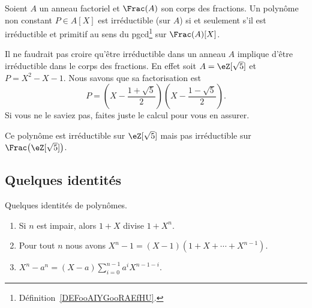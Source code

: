 \begin{corollary}       \label{CORooZCSOooHQVAOV}
    Soient \( A\) un anneau factoriel et \( \Frac(A)\) son corps des fractions. Un polynôme non constant \( P\in A[X]\) est irréductible (sur \( A\)) si et seulement s'il est irréductible et primitif au sens du pgcd\footnote{Définition~\ref{DEFooAIYGooRAEfHU}.} sur \( \Frac(A)[X]\).
\end{corollary}

\begin{example}
    Il ne faudrait pas croire qu'être irréductible dans un anneau \( A\) implique d'être irréductible dans le corps des fractions. En effet soit \( A=\eZ[\sqrt{ 5 }]\) et \( P=X^2-X-1\). Nous savons que sa factorisation est 
    \begin{equation}
        P=\left( X-\frac{ 1+\sqrt{ 5 } }{ 2 } \right)\left( X-\frac{ 1-\sqrt{ 5 } }{ 2 } \right).
    \end{equation}
    Si vous ne le saviez pas, faites juste le calcul pour vous en assurer.

    Ce polynôme est irréductible sur \( \eZ[\sqrt{ 5 }]\) mais pas irréductible sur \( \Frac\big( \eZ[\sqrt{ 5 }] \big)\).
\end{example}

\subsection{Quelques identités}

\begin{lemma}   \label{LemISPooHIKJBU}
    Quelques identités de polynômes.
    \begin{enumerate}
        \item   \label{ItemLTBooAcyMtN}
            Si \( n\) est impair, alors \( 1+X\) divise \( 1+X^n\).
        \item\label{ItemLTBooAcyMtNii}
            Pour tout \( n\) nous avons \( X^n-1=(X-1)(1+X+\cdots +X^{n-1})\).
        \item
            \( X^n-a^n=(X-a)\sum_{i=0}^{n-1}a^iX^{n-1-i}\).
    \end{enumerate}
\end{lemma}

